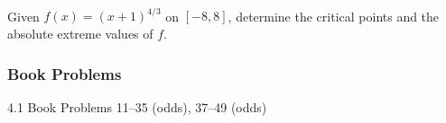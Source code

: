 \documentclass[cal1spr16Lectures.tex]{subfiles}
\begin{document}
\begin{frame}%
\frametitle{}
\begin{exe} Given $f(x)=(x+1)^{4/3}$ on $[-8,8]$, determine the critical points and the absolute extreme values of $f$. \end{exe}
\end{frame}

\subsubsection{Book Problems}

\begin{frame}
\begin{block}{4.1 Book Problems}
11--35 (odds), 37--49 (odds) 
\end{block}
\end{frame}
\end{document}
